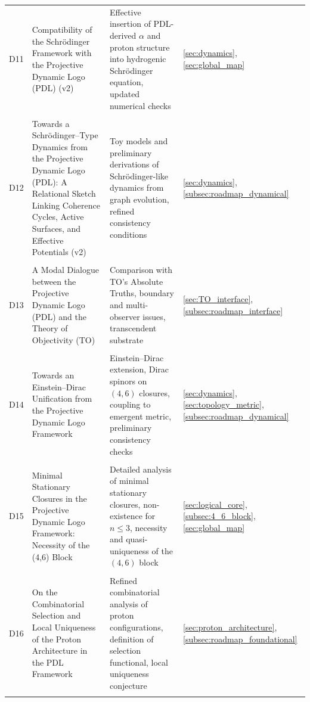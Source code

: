 \documentclass[11pt,a4paper]{article}
\begin{document}
\begin{longtable}{@{}p{0.9cm}L{5cm}L{6.5cm}L{2.4cm}@{}}
  D11 &
  Compatibility of the Schr\"odinger Framework with the Projective Dynamic Logo (PDL) (v2) &
  Effective insertion of PDL-derived $\alpha$ and proton structure into hydrogenic Schr\"odinger equation, updated numerical checks &
  \ref{sec:dynamics}, \ref{sec:global_map} \\\\[0.4em]

  D12 &
  Towards a Schr\"odinger--Type Dynamics from the Projective Dynamic Logo (PDL): A Relational Sketch Linking Coherence Cycles, Active Surfaces, and Effective Potentials (v2) &
  Toy models and preliminary derivations of Schr\"odinger-like dynamics from graph evolution, refined consistency conditions &
  \ref{sec:dynamics}, \ref{subsec:roadmap_dynamical} \\\\[0.4em]

  D13 &
  A Modal Dialogue between the Projective Dynamic Logo (PDL) and the Theory of Objectivity (TO) &
  Comparison with TO's Absolute Truths, boundary and multi-observer issues, transcendent substrate &
  \ref{sec:TO_interface}, \ref{subsec:roadmap_interface} \\\\[0.4em]

  D14 &
  Towards an Einstein--Dirac Unification from the Projective Dynamic Logo Framework &
  Einstein–Dirac extension, Dirac spinors on $(4,6)$ closures, coupling to emergent metric, preliminary consistency checks &
  \ref{sec:dynamics}, \ref{sec:topology_metric}, \ref{subsec:roadmap_dynamical} \\\\[0.4em]

  D15 &
  Minimal Stationary Closures in the Projective Dynamic Logo Framework: Necessity of the (4,6) Block &
  Detailed analysis of minimal stationary closures, non-existence for $n \leq 3$, necessity and quasi-uniqueness of the $(4,6)$ block &
  \ref{sec:logical_core}, \ref{subsec:4_6_block}, \ref{sec:global_map} \\\\[0.4em]

  D16 &
  On the Combinatorial Selection and Local Uniqueness of the Proton Architecture in the PDL Framework &
  Refined combinatorial analysis of proton configurations, definition of selection functional, local uniqueness conjecture &
  \ref{sec:proton_architecture}, \ref{subsec:roadmap_foundational} \\\\[0.4em]


\end{longtable}
\end{document}
